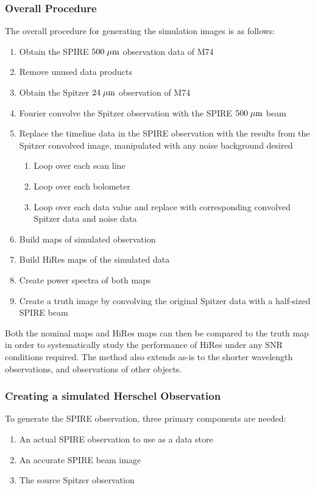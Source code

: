 \subsubsection{Overall Procedure}
The overall procedure for generating the simulation images is as follows:
\begin{enumerate}
    \item{Obtain the SPIRE $500\;\mathrm{\mu m}$ observation data of M74}
    \item{Remove unused data products}
    \item{Obtain the Spitzer $24\;\mathrm{\mu m}$ observation of M74}
    \item{Fourier convolve the Spitzer observation with the SPIRE $500\;\mathrm{\mu m}$ beam}
    \item{Replace the timeline data in the SPIRE observation with the results from the Spitzer convolved image, manipulated with any noise background desired}
    \begin{enumerate}
        \item{Loop over each scan line}
        \item{Loop over each bolometer}
        \item{Loop over each data value and replace with corresponding convolved Spitzer data and noise data}
    \end{enumerate}
    \item{Build maps of simulated observation}
    \item{Build HiRes maps of the simulated data}
    \item{Create power spectra of both maps}
    \item{Create a truth image by convolving the original Spitzer data with a half-sized SPIRE beam}
\end{enumerate}

Both the nominal maps and HiRes maps can then be compared to the truth map in order to systematically study the performance of HiRes under any SNR conditions required. The method also extends as-is to the shorter wavelength observations, and observations of other objects.

\subsubsection{Creating a simulated Herschel Observation}

To generate the SPIRE observation, three primary components are needed:

\begin{enumerate}
    \item{An actual SPIRE observation to use as a data store}
    \item{An accurate SPIRE beam image}
    \item{The source Spitzer observation}
\end{enumerate}

